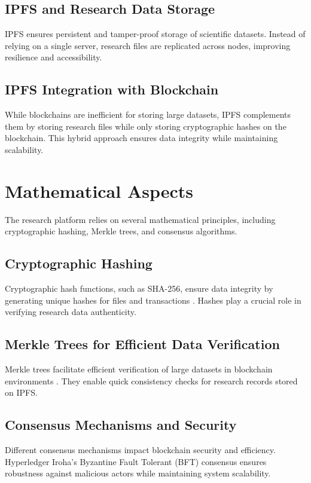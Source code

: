 \documentclass{article}
\begin{document}
\subsection{IPFS and Research Data Storage}
IPFS ensures persistent and tamper-proof storage of scientific datasets. Instead of relying on a single server, research files are replicated across nodes, improving resilience and accessibility.

\subsection{IPFS Integration with Blockchain}
While blockchains are inefficient for storing large datasets, IPFS complements them by storing research files while only storing cryptographic hashes on the blockchain. This hybrid approach ensures data integrity while maintaining scalability.

\section{Mathematical Aspects}

The research platform relies on several mathematical principles, including cryptographic hashing, Merkle trees, and consensus algorithms.

\subsection{Cryptographic Hashing}
Cryptographic hash functions, such as SHA-256, ensure data integrity by generating unique hashes for files and transactions \cite{rivest1992md}. Hashes play a crucial role in verifying research data authenticity.

\subsection{Merkle Trees for Efficient Data Verification}
Merkle trees facilitate efficient verification of large datasets in blockchain environments \cite{merkle1988digital}. They enable quick consistency checks for research records stored on IPFS.

\subsection{Consensus Mechanisms and Security}
Different consensus mechanisms impact blockchain security and efficiency. Hyperledger Iroha’s Byzantine Fault Tolerant (BFT) consensus ensures robustness against malicious actors while maintaining system scalability.
\end{document}
